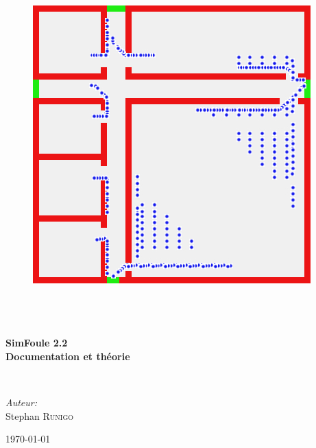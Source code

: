 \begin{titlepage}
\begin{center}
\begin{figure}[htbp]
\begin{minipage}[c]{.45\linewidth}
\begin{center}
\includegraphics[scale=0.45]{./titre/SimFoule0105}
\end{center}
\end{minipage}
\end{figure}
~\\[1cm]

\textsc{\Large }\\[0.5cm]

\HRule \\[0.4cm]

{\huge \bfseries  SimFoule 2.2\\[0.2cm] 
Documentation et théorie\\[0.4cm] }

\HRule \\[1.5cm]

\begin{minipage}{0.4\textwidth}
\begin{flushleft} \large
\end{flushleft}
\end{minipage}
\begin{minipage}{0.4\textwidth}
\begin{flushright} \large
\emph{Auteur:}\\
Stephan \textsc{Runigo}
\end{flushright}
\end{minipage}

\vfill

{\large \today}

\end{center}
\end{titlepage}
